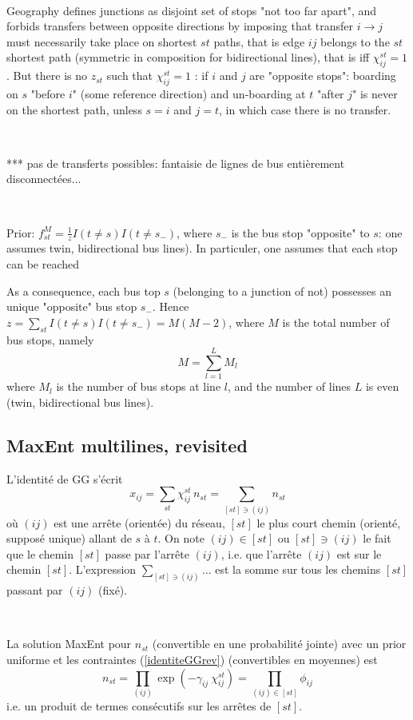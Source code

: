 \documentclass{article}
\theoremstyle{plain}
\begin{document}
\ 

Geography defines junctions as disjoint set of stops "not too far apart", and forbids transfers between opposite directions by imposing that transfer $i\to j$ must necessarily take place on shortest $st$ paths, that is edge $ij$ belongs to the $st$ shortest path (symmetric in composition for bidirectional lines), that is iff 
$\chi_{ij}^{st}=1$. But there is no $z_{st}$ such that  $\chi_{ij}^{st}=1$ : if $i$ and $j$ are "opposite stops": boarding on $s$ "before $i$" (some reference direction) and un-boarding at $t$ "after $j$" is never on the shortest path, unless $s=i$ and $j=t$, in which case there is no transfer.  


\

*** pas de transferts possibles: fantaisie de lignes de bus entièrement disconnectées...


\

Prior: $f^{M}_{st}=\frac{1}{z} I(t\neq s)I(t\neq s_-)$, where $s_-$ is the bus stop "opposite" to $s$: one assumes twin, bidirectional bus lines). In particuler, one assumes that each stop can be reached 

As a consequence, each bus top $s$  (belonging to a junction of not) possesses an unique  "opposite" bus stop $s_-$. Hence $z=\sum_{st} I(t\neq s)I(t\neq s_-)=M(M-2)$, where $M$ is the total number of bus stops, namely 
\begin{displaymath}
M=\sum_{l=1}^L M_l
\end{displaymath}
where $M_l$ is the number of bus stops at line $l$, and the number of lines $L$ is even (twin, bidirectional bus lines). 

\subsection{MaxEnt multilines, revisited} 
L'identité de GG s'écrit 
\begin{equation}
\label{identiteGGrev}
x_{ij}=\sum_{st}\chi_{ij}^{st}\, n_{st}=\sum_{[st]\ni (ij)}n_{st}
\end{equation}
où $(ij)$ est une arrête (orientée) du réseau, $[st]$ le plus court chemin (orienté, supposé unique) allant de $s$ à $t$. On note $(ij)\in[st]$ ou $[st]\ni (ij)$ le fait que le chemin $[st]$ passe par l'arrête $(ij)$, i.e. que l'arrête $(ij)$ est sur le chemin $[st]$. L'expression $\sum_{[st]\ni (ij)}\ldots$ est la somme sur tous les chemins $[st]$ passant par $(ij)$ (fixé). 

\

La solution MaxEnt pour $n_{st}$ (convertible en une probabilité jointe) avec un prior uniforme et les contraintes  (\ref{identiteGGrev}) (convertibles en moyennes) est 
\begin{equation}
\label{solMaxENT}
n_{st}=\prod_{(ij)}\exp(-\gamma_{ij}\: \chi_{ij}^{st}) =\prod_{(ij)\in[st]}\phi_{ij}
\end{equation}
i.e. un produit de termes consécutifs sur les arrêtes de $[st]$. 
\end{document}
